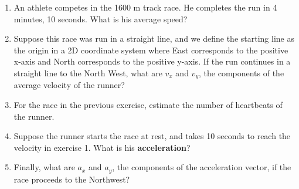 \documentclass{article}
\begin{document}
\begin{enumerate}
\item An athlete competes in the 1600 m track race.  He completes the run in 4 minutes, 10 seconds.  What is his average speed? \\ \vspace{3cm}
\item Suppose this race was run in a straight line, and we define the starting line as the origin in a 2D coordinate system where East corresponds to the positive x-axis and North corresponds to the positive y-axis.  If the run continues in a straight line to the North West, what are $v_x$ and $v_y$, the components of the average velocity of the runner? \\ \vspace{3cm}
\item For the race in the previous exercise, estimate the number of heartbeats of the runner. \\ \vspace{3cm}
\item Suppose the runner starts the race at rest, and takes 10 seconds to reach the velocity in exercise 1.  What is his \textbf{acceleration}? \\ \vspace{3cm}
\item Finally, what are $a_x$ and $a_y$, the components of the acceleration vector, if the race proceeds to the Northwest?
\end{enumerate}
\end{document}
